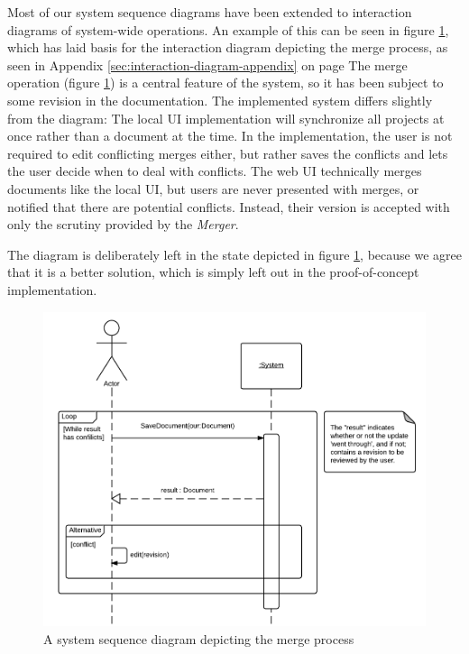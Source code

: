 Most of our system sequence diagrams have been extended to interaction diagrams of system-wide operations. 
An example of this can be seen in figure \ref{fig:merge-ssd}, 
which has laid basis for the interaction diagram depicting the merge process, 
as seen in Appendix \ref{sec:interaction-diagram-appendix} on page \pageref{fig:uc7-interaction-diagram}
The merge operation (figure \ref{fig:merge-ssd}) is a central feature of the \SOP{} 
system, so it has been subject to some revision in the documentation.
The implemented system differs slightly from the diagram: The local UI implementation will synchronize all projects at once rather than a document at the time. 
In the implementation, the user is not required to edit conflicting merges either, but rather 
saves the conflicts and lets the user decide when to deal with conflicts.
The web UI technically merges documents like the local UI, but users are never presented with merges, or notified that there are potential conflicts. Instead, their version is accepted with only the scrutiny provided by the \emph{Merger}.

The diagram is deliberately left in the state depicted in figure \ref{fig:merge-ssd}, because we agree that it is a better solution, which is simply left out in the proof-of-concept \SOP{} implementation.

\begin{figure}[hbt]
	\centering
	\includegraphics[width=1\textwidth]{Software_analysis/graphics/Merge-ssd.png}
	\caption{A system sequence diagram depicting the merge process}
	\label{fig:merge-ssd}
\end{figure}
